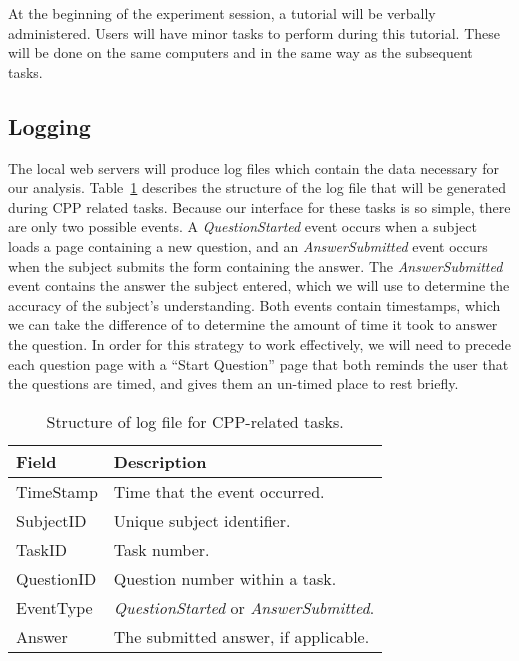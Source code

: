 \documentclass[11pt]{article}
\newcommand{\event}[1]{\textit{#1}}
\begin{document}
	At the beginning of the experiment session, a tutorial
	will be verbally administered.  Users will have minor tasks to perform during
	this tutorial.  These will be done on the same computers and in the same way
	as the subsequent tasks.
	
	
	\subsection{Logging}
	\label{sec:logging}
	
	The local web servers will produce log files which contain the data necessary
	for our analysis.  Table~\ref{tbl:cpplog} describes the structure of the log
	file that will be generated during CPP related tasks.  Because our interface
	for these tasks is so simple, there are only two possible events.  A
	\event{QuestionStarted} event occurs when a subject loads a page containing a
	new question, and an \event{AnswerSubmitted} event occurs when the subject
	submits the form containing the answer.  The \event{AnswerSubmitted} event
	contains the answer the subject entered, which we will use to determine the
	accuracy of the subject's understanding.  Both events contain timestamps, which
	we can take the difference of to determine the amount of time it took to answer
	the question.  In order for this strategy to work effectively, we will need to
	precede each question page with a ``Start Question'' page that both reminds the
	user that the questions are timed, and gives them an un-timed place to rest
	briefly.
	
	\begin{table}
		\centering
		\begin{tabular}{|l | p{}|}
			\hline
			\textbf{Field} & \textbf{Description} \\
			\hline
			TimeStamp  & Time that the event occurred. \\
			SubjectID  & Unique subject identifier. \\
			TaskID     & Task number. \\
			QuestionID & Question number within a task. \\
			EventType  & \event{QuestionStarted} or \event{AnswerSubmitted}. \\
			Answer     & The submitted answer, if applicable. \\
			\hline
		\end{tabular}
		\caption{Structure of log file for CPP-related tasks.}
		\label{tbl:cpplog}
	\end{table}
	
\end{document}
